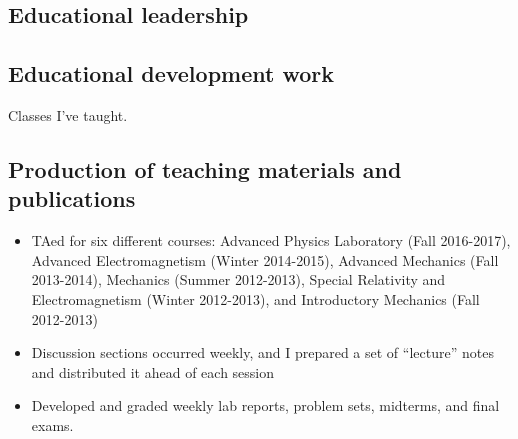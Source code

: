 \subsection{Educational leadership \noneyet}\label{ssec:educational-leadership-noneyet}
\subsection{Educational development work}\label{ssec:educational-development-work}

Classes I've taught.

\subsection{Production of teaching materials and publications}\label{ssec:production-of-teaching-materials-and-publications}

\begin{itemize}
	\item TAed for six different courses: Advanced Physics Laboratory (Fall 2016-2017), Advanced Electromagnetism (Winter 2014-2015), Advanced Mechanics (Fall 2013-2014), Mechanics (Summer 2012-2013), Special Relativity and Electromagnetism (Winter 2012-2013), and Introductory Mechanics (Fall 2012-2013)
	\item Discussion sections occurred weekly, and I prepared a set of \enquote{lecture} notes and distributed it ahead of each session
	\item Developed and graded weekly lab reports, problem sets, midterms, and final exams.
\end{itemize}

